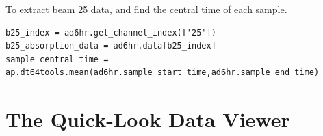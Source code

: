 \documentclass{article}
\begin{document}
To extract beam 25 data, and find the central time of each sample.

\begin{lstlisting}[style=pythonstyle]
b25_index = ad6hr.get_channel_index(['25'])
b25_absorption_data = ad6hr.data[b25_index]
sample_central_time = ap.dt64tools.mean(ad6hr.sample_start_time,ad6hr.sample_end_time) 
\end{lstlisting}


\section{The Quick-Look Data Viewer}
\end{document}
